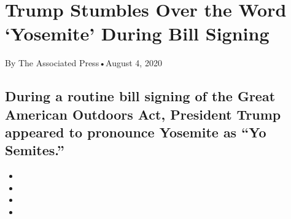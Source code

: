 \hypertarget{trump-stumbles-over-the-word-yosemite-during-bill-signing-1}{%
\section{Trump Stumbles Over the Word `Yosemite' During Bill
Signing}\label{trump-stumbles-over-the-word-yosemite-during-bill-signing-1}}

By The Associated Press•August 4, 2020

\hypertarget{during-a-routine-bill-signing-of-the-great-american-outdoors-act-president-trump-appeared-to-pronounce-yosemite-as-yo-semites-1}{%
\subsection{During a routine bill signing of the Great American Outdoors
Act, President Trump appeared to pronounce Yosemite as ``Yo
Semites.''}\label{during-a-routine-bill-signing-of-the-great-american-outdoors-act-president-trump-appeared-to-pronounce-yosemite-as-yo-semites-1}}

\begin{itemize}
\item
\item
\item
\item
\end{itemize}

